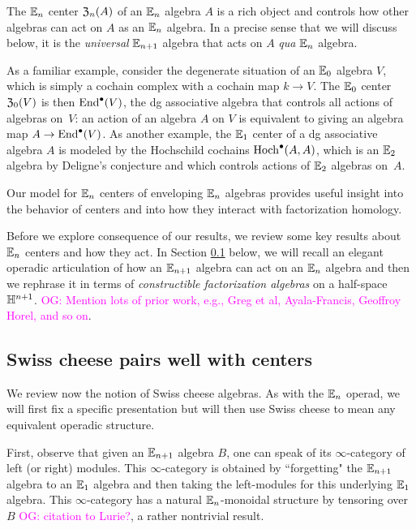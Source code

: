 \documentclass[11pt]{amsart}
\numberwithin{equation}{section}
\def\owen{\textcolor{magenta}{OG: }\textcolor{magenta}}
\begin{document}
The $\mathbb E_n$ center ${\frak Z}_n(A)$ of an $\mathbb E_n$ algebra $A$ is a rich object 
and controls how other algebras can act on $A$ as an $\mathbb E_n$ algebra.
In a precise sense that we will discuss below, 
it is the {\em universal} $\mathbb E_{n+1}$ algebra that acts on $A$ {\em qua} $\mathbb E_n$ algebra. 

As a familiar example, consider the degenerate situation of an $\mathbb E_0$ algebra $V$, 
which is simply a cochain complex with a cochain map $k \to V$.
The $\mathbb E_0$ center ${\frak Z}_0(V)$ is then ${\rm End}^\bullet(V)$,
the dg associative algebra that controls all actions of algebras on~$V$:
an action of an algebra $A$ on $V$ is equivalent to giving an algebra map $A \to {\rm End}^\bullet(V)$.
As another example, the $\mathbb E_1$ center of a dg associative algebra $A$ is modeled by the Hochschild cochains ${\rm Hoch}^\bullet(A,A)$,
which is an $\mathbb E_2$ algebra by Deligne's conjecture and which controls actions of $\mathbb E_2$ algebras on~$A$.

Our model for $\mathbb E_n$ centers of enveloping $\mathbb E_n$ algebras provides useful insight into the behavior of centers and into how they interact with factorization homology.

Before we explore consequence of our results,
we review some key results about $\mathbb E_n$ centers and how they act.
In Section \ref{sec:swiss} below, we will recall an elegant operadic articulation of how an $\mathbb E_{n+1}$ algebra can act on an $\mathbb E_n$ algebra 
and then we rephrase it in terms of {\em constructible factorization algebras} on a half-space~$\mathbb H^{n+1}$. 
\owen{Mention lots of prior work, e.g., Greg et al, Ayala-Francis, Geoffroy Horel, and so on}.

\subsection{Swiss cheese pairs well with centers} \label{sec:swiss}

We review now the notion of Swiss cheese algebras.
As with the $\mathbb E_n$ operad, we will first fix a specific presentation but will then use Swiss cheese to mean any equivalent operadic structure.

First, observe that given an $\mathbb E_{n+1}$ algebra $B$, 
one can speak of its $\infty$-category of left (or right) modules.
This $\infty$-category is obtained by ``forgetting" the $\mathbb E_{n+1}$ algebra to an $\mathbb E_1$ algebra and then taking the left-modules for this underlying $\mathbb E_1$ algebra.
This $\infty$-category has a natural $\mathbb E_n$-monoidal structure by tensoring over~$B$
\owen{citation to Lurie?}, a rather nontrivial result.
\end{document}
